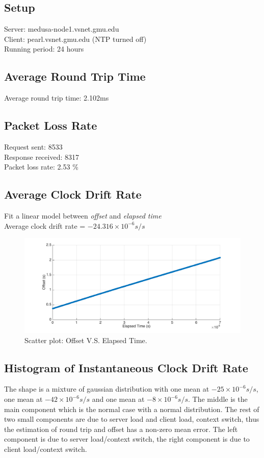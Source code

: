 \documentclass[11pt, oneside]{article}   	%
\begin{document}
\subsection{Setup}
Server: medusa-node1.vsnet.gmu.edu \\
Client: pearl.vsnet.gmu.edu (NTP turned off)\\
Running period: 24 hours

\subsection{Average Round Trip Time}
Average round trip time: 2.102ms

\subsection{Packet Loss Rate}
Request sent: 8533 \\
Response received: 8317 \\
Packet loss rate: 2.53 \%

\subsection{Average Clock Drift Rate}
Fit a linear model between {\it offset} and {\it elapsed time} \\ 
Average clock drift rate =  $-24.316 \times 10^{-6}s/s$

\begin{figure}[ht] %
   \centering
   \includegraphics[width=6in]{../offset.png} 
   \caption{Scatter plot: Offset V.S. Elapsed Time.}
   \label{fig:cdr}
\end{figure}

\subsection{Histogram of Instantaneous Clock Drift Rate}
The shape is a mixture of gaussian distribution with one mean at $-25 \times 10^{-6} s/s$, one mean at $-42 \times 10^{-6} s/s$ and one mean at $-8 \times 10^{-6} s/s $. The middle is the main component which is the normal case with a normal distribution. The rest of two small components are due to server load and client load, context switch, thus the estimation of round trip and offset has a non-zero mean error.
The left component is due to server load/context switch, the right component is due to client load/context switch.
\end{document}
